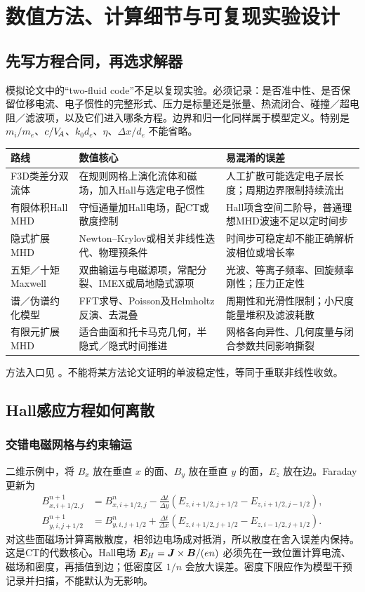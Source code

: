 \chapter{数值方法、计算细节与可复现实验设计}\label{ch:numerics}
\section{先写方程合同，再选求解器}
模拟论文中的“two-fluid code”不足以复现实验。必须记录：是否准中性、是否保留位移电流、电子惯性的完整形式、压力是标量还是张量、热流闭合、碰撞／超电阻／滤波项，以及它们进入哪条方程。边界和归一化同样属于模型定义。特别是 $m_i/m_e$、$c/V_{\!A}$、$k_0d_e$、$\eta$、$\Delta x/d_e$ 不能省略。

\begin{longtable}{P{30mm}P{54mm}P{64mm}}
\toprule 路线 & 数值核心 & 易混淆的误差\\\midrule
F3D类差分双流体 & 在规则网格上演化流体和磁场，加入Hall与选定电子惯性 & 人工扩散可能选定电子层长度；周期边界限制持续流出\\
有限体积Hall MHD & 守恒通量加Hall电场，配CT或散度控制 & Hall项含空间二阶导，普通理想MHD波速不足以定时间步\\
隐式扩展MHD & Newton--Krylov或相关非线性迭代、物理预条件 & 时间步可稳定却不能正确解析波相位或增长率\\
五矩／十矩Maxwell & 双曲输运与电磁源项，常配分裂、IMEX或局地隐式源项 & 光波、等离子频率、回旋频率刚性；压力正定性\\
谱／伪谱约化模型 & FFT求导、Poisson及Helmholtz反演、去混叠 & 周期性和光滑性限制；小尺度能量堆积及滤波耗散\\
有限元扩展MHD & 适合曲面和托卡马克几何，半隐式／隐式时间推进 & 网格各向异性、几何度量与闭合参数共同影响撕裂\\\bottomrule
\end{longtable}
方法入口见 \citet{Cassak2008,Toth2008,Arnold2008,Hakim2008,Wang2015}。不能将某方法论文证明的单波稳定性，等同于重联非线性收敛。

\section{Hall感应方程如何离散}
\subsection{交错电磁网格与约束输运}
二维示例中，将 $B_x$ 放在垂直 $x$ 的面、$B_y$ 放在垂直 $y$ 的面，$E_z$ 放在边。Faraday更新为
\begin{align}
B_{x,i+1/2,j}^{n+1}&=B_{x,i+1/2,j}^n-\frac{\Delta t}{\Delta y}(E_{z,i+1/2,j+1/2}-E_{z,i+1/2,j-1/2}),\\
B_{y,i,j+1/2}^{n+1}&=B_{y,i,j+1/2}^n+\frac{\Delta t}{\Delta x}(E_{z,i+1/2,j+1/2}-E_{z,i-1/2,j+1/2}).
\end{align}
对这些面磁场计算离散散度，相邻边电场成对抵消，所以散度在舍入误差内保持。这是CT的代数核心。Hall电场 $\bm{E}_H=\bm{J}\times\bm{B}/(en)$ 必须先在一致位置计算电流、磁场和密度，再插值到边；低密度区 $1/n$ 会放大误差。密度下限应作为模型干预记录并扫描，不能默认为无影响。

